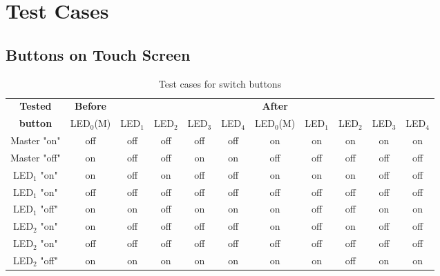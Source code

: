 \section{Test Cases}
\subsection{Buttons on Touch Screen }

{\renewcommand{\arraystretch}{1.3}%
\begin{table}[H]
\begin{tabular}{c|c c c c c|c c c c c}
\textbf{Tested}& \textbf{Before}& &  & & &\textbf{After} & &  & & \\
 \textbf{button} & LED$_0$(M) &LED$_1$& LED$_2$& LED$_3$& LED$_4$ & LED$_0$(M)& LED$_1$& LED$_2$& LED$_3$ &LED$_4$ \\\hline
Master "on" & off &off& off& off& off & on& on& on& on &on \\ 
Master "off" & on &off& off& on& on & off& off& off& off &off \\\hline
LED$_1$ "on" & on &off& on& off& off & on& on& on& off &off \\
LED$_1$ "on" & off &off& off& off& off & off& off& off& off &off \\
LED$_1$ "off" & on &on& off& on& on & on& off& off& on &on \\ \hline
LED$_2$ "on" & on &off& off& off& off & on& off& on& off &off \\
LED$_2$ "on" & off &off& off& off& off & off& off& off& off &off \\
LED$_2$ "off" & on &on& on& on& on & on& on& off& on &on \\ \hline
\end{tabular}
\caption{\label{tab:Switch}Test cases for switch buttons}
\end{table}

}
